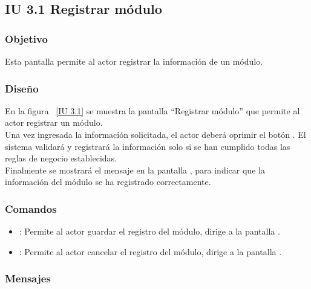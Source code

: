 \subsection{IU 3.1 Registrar módulo}

\subsubsection{Objetivo}
	
    Esta pantalla permite al actor registrar la información de un módulo.

\subsubsection{Diseño}

    En la figura ~\ref{IU 3.1} se muestra la pantalla ``Registrar módulo'' que permite al actor registrar un módulo. \\
    
    Una vez ingresada la información solicitada, el actor deberá oprimir el botón . El sistema validará y registrará la 
    información solo si se han cumplido todas las reglas de negocio establecidas.  \\
    
    Finalmente se mostrará el mensaje  en la pantalla , 
    para indicar que la información del módulo
    se ha registrado correctamente.        



\subsubsection{Comandos}
\begin{itemize}
	\item {}: Permite al actor guardar el registro del módulo, dirige a la pantalla .
	\item {}: Permite al actor cancelar el registro del módulo, dirige a la pantalla .
\end{itemize}

\subsubsection{Mensajes}
	
